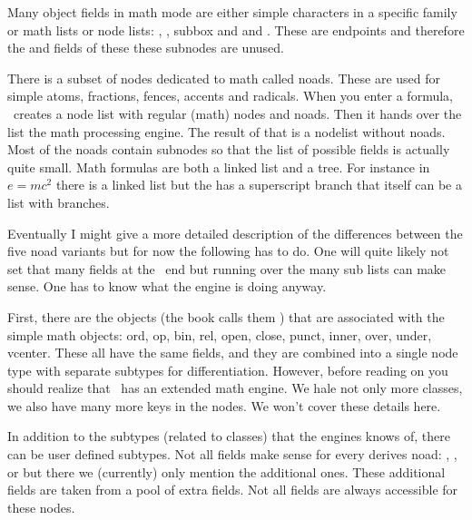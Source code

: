 \stopsubsection

\stopsection

\startsection[title={Math nodes}]

\startsubsection[title=The concept]

Many object fields in math mode are either simple characters in a specific family
or math lists or node lists: , , {subbox}
and  and . These are endpoints and therefore the
 and  fields of these these subnodes are unused.

There is a subset of nodes dedicated to math called noads. These are used for
simple atoms, fractions, fences, accents and radicals. When you enter a formula,
\TEX\ creates a node list with regular (math) nodes and noads. Then it hands over
the list the math processing engine. The result of that is a nodelist without
noads. Most of the noads contain subnodes so that the list of possible fields is
actually quite small. Math formulas are both a linked list and a tree. For
instance in $e = mc^2$ there is a linked list  but the 
has a superscript branch that itself can be a list with branches.

Eventually I might give a more detailed description of the differences between
the five noad variants but for now the following has to do. One will quite likely
not set that many fields at the \LUA\ end but running over the many sub lists can
make sense. One has to know what the engine is doing anyway.

\stopsubsection

\startsubsection[title=noad]

First, there are the objects (the \TEX book calls them ) that are
associated with the simple math objects: ord, op, bin, rel, open, close, punct,
inner, over, under, vcenter. These all have the same fields, and they are
combined into a single node type with separate subtypes for differentiation.
However, before reading on you should realize that \LUAMETATEX\ has an extended
math engine. We hale not only more classes, we also have many more keys in the
nodes. We won't cover these details here.


In addition to the subtypes (related to classes) that the engines knows of, there
can be user defined subtypes. Not all fields make sense for every derives noad:
, ,  or  but there we
(currently) only mention the additional ones. These additional fields are taken
from a pool of extra fields. Not all fields are always accessible for these nodes.

